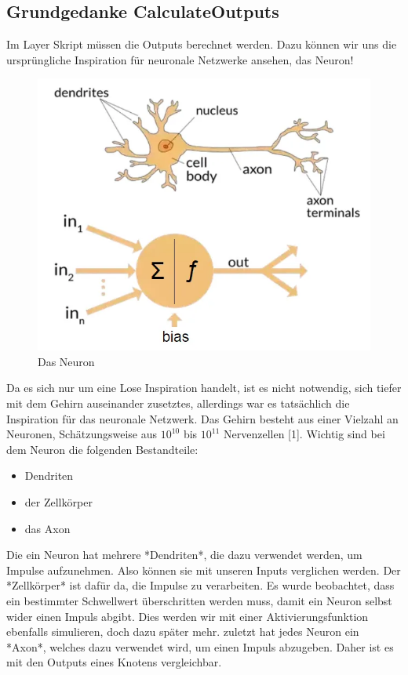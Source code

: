 \documentclass[12pt]{article}
\begin{document}
\subsection{Grundgedanke CalculateOutputs}Im Layer Skript müssen die Outputs berechnet werden. Dazu können wir uns die ursprüngliche Inspiration für neuronale Netzwerke ansehen, das Neuron!
\begin{figure}[H]
\centering
\includegraphics[scale=0.40]{./Images/Pasted image 20230912175903.png}
\caption{Das Neuron}
\label{Das Neuron}
\end{figure}
Da es sich nur um eine Lose Inspiration handelt, ist es nicht notwendig, sich tiefer mit dem Gehirn auseinander zusetztes, allerdings war es tatsächlich die Inspiration für das neuronale Netzwerk. Das Gehirn besteht aus einer Vielzahl an Neuronen, Schätzungsweise aus $10^{10}$ bis $10^{11}$ Nervenzellen [1].
Wichtig sind bei dem Neuron die folgenden Bestandteile:
\begin{itemize}
  \item Dendriten
  \item der Zellkörper
  \item das Axon
\end{itemize}
  Die ein Neuron hat mehrere *Dendriten*, die dazu verwendet werden, um Impulse aufzunehmen. Also können sie mit unseren Inputs verglichen werden. Der *Zellkörper* ist dafür da, die Impulse zu verarbeiten. Es wurde beobachtet, dass ein bestimmter Schwellwert überschritten werden muss, damit ein Neuron selbst wider einen Impuls abgibt. Dies werden wir mit einer Aktivierungsfunktion ebenfalls simulieren, doch dazu später mehr. zuletzt hat jedes Neuron ein *Axon*, welches dazu verwendet wird, um einen Impuls abzugeben. Daher ist es mit den Outputs eines Knotens vergleichbar.
\end{document}
